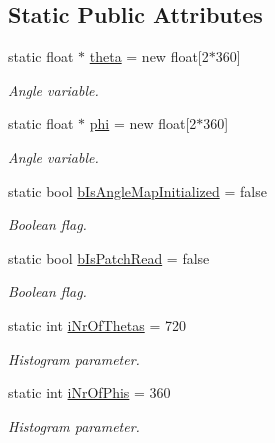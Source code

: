 \subsection*{Static Public Attributes}
\begin{DoxyCompactItemize}
\item 
static float $\ast$ \hyperlink{classITL__histogram_a3111dfec91196d7ed491c3552997ba59}{theta} = new float\mbox{[}2$\ast$360\mbox{]}
\begin{DoxyCompactList}\small\item\em Angle variable. \item\end{DoxyCompactList}\item 
static float $\ast$ \hyperlink{classITL__histogram_a055060af9afbc0a52ded8c00b7532ab4}{phi} = new float\mbox{[}2$\ast$360\mbox{]}
\begin{DoxyCompactList}\small\item\em Angle variable. \item\end{DoxyCompactList}\item 
static bool \hyperlink{classITL__histogram_ab5e8522dc950efff727735f4a8176be5}{bIsAngleMapInitialized} = false
\begin{DoxyCompactList}\small\item\em Boolean flag. \item\end{DoxyCompactList}\item 
static bool \hyperlink{classITL__histogram_a952fde093bb3f0e06f6504a3fd3f2115}{bIsPatchRead} = false
\begin{DoxyCompactList}\small\item\em Boolean flag. \item\end{DoxyCompactList}\item 
static int \hyperlink{classITL__histogram_a635c7179b23ea13e38258f24582e3e8b}{iNrOfThetas} = 720
\begin{DoxyCompactList}\small\item\em Histogram parameter. \item\end{DoxyCompactList}\item 
static int \hyperlink{classITL__histogram_ac58c7bb82ec5d99ae86223e414d34c26}{iNrOfPhis} = 360
\begin{DoxyCompactList}\small\item\em Histogram parameter. \item\end{DoxyCompactList}\item 

\end{DoxyCompactItemize}
